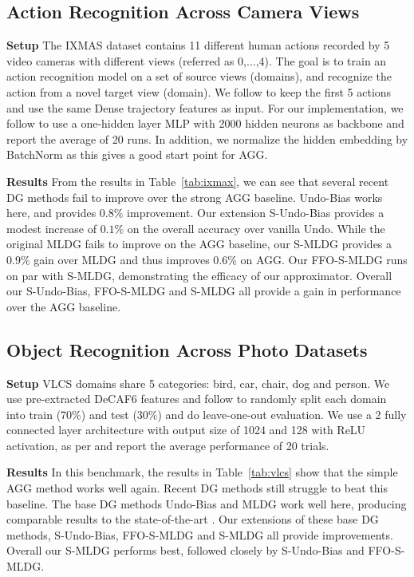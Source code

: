 \documentclass[runningheads]{llncs}
\newcommand{\nameS}{S-MLDG}
\newcommand{\nameFFS}{FFO-\nameS}
\newcommand{\hundo}{S-Undo-Bias}
\newcommand{\keypoint}[1]{\vspace{0.1cm}\noindent\textbf{#1}\quad}
\begin{document}
\subsection{Action Recognition Across Camera Views}
\keypoint{Setup}
The IXMAS dataset contains 11 different human actions recorded by 5 video cameras with different views (referred as 0,...,4). The goal is to train an action recognition model on a set of source views (domains), and recognize the action from a novel target view (domain).
We follow \cite{mmdaaecvpr2018} to keep the first 5 actions and use the same Dense trajectory features as input. For our implementation, we follow \cite{mmdaaecvpr2018} to use a one-hidden layer MLP with 2000 hidden neurons as backbone and report the average of 20 runs. In addition, we normalize the hidden embedding by BatchNorm \cite{pmlr-v37-ioffe15} as this gives a good start point for AGG.

\keypoint{Results}
From the results in Table~\ref{tab:ixmax}, we can see that several recent DG methods \cite{Li2018MLDG,shiv2018dg,NIPS2018_metareg,mmdaaecvpr2018} fail to improve over the strong AGG baseline. Undo-Bias works here, and provides $0.8\%$ improvement. Our extension \hundo{} provides a modest increase of $0.1\%$ on the overall accuracy over vanilla Undo. While the original MLDG \cite{Li2018MLDG} fails to improve on the AGG baseline, our \nameS{} provides a 0.9\% gain over MLDG and thus improves 0.6\% on AGG. Our \nameFFS{} runs on par with \nameS{}, demonstrating the efficacy of our approximator. Overall our \hundo{}, \nameFFS{} and \nameS{} all provide a gain in performance over the AGG baseline.



\subsection{Object Recognition Across Photo Datasets}
\keypoint{Setup} VLCS domains share 5 categories: bird, car, chair, dog and person. We use  pre-extracted DeCAF6 features and follow \cite{motiian2017CCSA} to randomly split each domain into train (70\%) and test (30\%) and do leave-one-out evaluation. We use a 2 fully connected layer architecture with output size of 1024 and 128 with ReLU activation, as per \cite{motiian2017CCSA} and report the average performance of 20 trials. 


\keypoint{Results}
In this benchmark, the results in Table~\ref{tab:vlcs} show that the simple AGG method works well again. Recent DG methods \cite{shiv2018dg,NIPS2018_metareg} still struggle to beat this baseline. The base DG methods Undo-Bias \cite{ECCV12_Khosla} and MLDG \cite{Li2018MLDG} work well here, producing comparable results to the state-of-the-art \cite{mmdaaecvpr2018}. Our extensions of these base DG methods, \hundo{}, \nameFFS{} and \nameS{} all provide improvements. Overall our \nameS{} performs best, followed closely by \hundo{} and \nameFFS{}.
\end{document}
